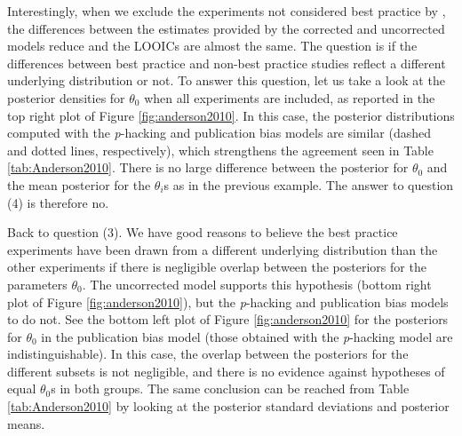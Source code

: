 \documentclass{article}
\theoremstyle{plain}
\theoremstyle{definition}
\begin{document}
Interestingly, when we exclude the experiments not considered best practice by \citet{anderson2010violent}, the differences between the estimates provided by the corrected and uncorrected models reduce and the LOOICs are almost the same. The question is if the differences between best practice and non-best practice studies reflect a different underlying distribution or not. To answer this question, let us take a look at the posterior densities for $\theta_{0}$ when all experiments are included, as reported in the top right plot of Figure \ref{fig:anderson2010}. In this case, the posterior distributions computed with the \textit{p}-hacking and publication bias models are similar (dashed and dotted lines, respectively), which strengthens the agreement seen in Table \ref{tab:Anderson2010}. There is no large difference between the posterior for $\theta_{0}$ and the mean posterior for the $\theta_{i}$s as in the previous example. The answer to question (4) is therefore no.

Back to question (3). We have good reasons to believe the best practice experiments have been drawn from a different underlying distribution than the other experiments if there is negligible overlap between the posteriors for the parameters $\theta_{0}$. The uncorrected model supports this hypothesis (bottom right plot of Figure \ref{fig:anderson2010}), but the \textit{p}-hacking and publication bias models to do not. See the bottom left plot of Figure \ref{fig:anderson2010} for the posteriors for $\theta_0$ in the publication bias model (those obtained with the \textit{p}-hacking model are indistinguishable). In this case, the overlap between the posteriors for the different subsets is not negligible, and there is no evidence against hypotheses of equal $\theta_0$s in both groups. The same conclusion can be reached from Table \ref{tab:Anderson2010} by looking at the posterior standard deviations and posterior means.
\end{document}
